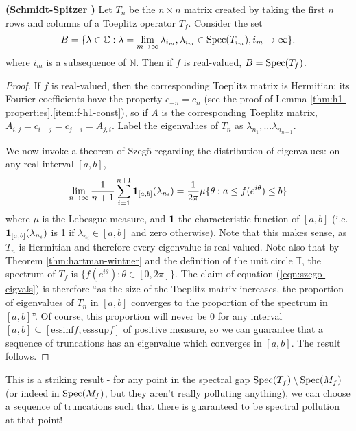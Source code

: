 \documentclass[../main.tex]{subfiles}
\begin{document}
\begin{theorem}{\textbf{(Schmidt-Spitzer \parencite{schmidt1960toeplitz})}}
Let $T_n$ be the $n \times n$ matrix created by taking the first $n$ rows and columns of a Toeplitz operator $T_f$. Consider the set
$$B = \{\lambda \in \mathbb{C} : \lambda = \lim_{m \rightarrow \infty} \lambda_{i_m}, \lambda_{i_m} \in \mathrm{Spec}(T_{i_m}), i_m \rightarrow \infty \}.$$
where $i_m$ is a subsequence of $\mathbb{N}$. Then if $f$ is real-valued, $B = \mathrm{Spec}(T_f)$.
\end{theorem}
\begin{proof}
If $f$ is real-valued, then the corresponding Toeplitz matrix is Hermitian; its Fourier coefficients have the property $\overline{c_{-n}} = c_n$ (see 
the proof of Lemma \ref{thm:h1-properties}.\ref{item:f-h1-const}), so if $A$ is the corresponding Toeplitz matrix,
 $A_{i,j} = c_{i-j} = \overline{c_{j-i}} = \overline{A_{j,i}}$. Label the eigenvalues of $T_n$ as $\lambda_{n_1}, ... \lambda_{n_{n+1}}$. 
 
 We now invoke a theorem of Szeg\"o \cite{grenander2001toeplitz} regarding the distribution of eigenvalues: on any real interval $[a, b]$,
\begin{equation}\label{eqn:szego-eigvals}
\lim_{n \rightarrow \infty} \frac{1}{n+1} \sum_{i=1}^{n+1} \mathbf{1}_{[a, b]}(\lambda_{n_i}) = \frac{1}{2 \pi} \mu\{\theta : a \leq f(e^{i \theta}) \leq b\}
\end{equation}
where $\mu$ is the Lebesgue measure, and $\mathbf{1}$ the characteristic function of $[a,b]$ 
(i.e. $\mathbf{1}_{[a, b]}(\lambda_{n_i})$ is 1 if $\lambda_{n_i} \in [a, b]$ and zero otherwise). Note that this makes sense, as $T_n$ is Hermitian and
therefore every eigenvalue is real-valued. Note also that by Theorem \ref{thm:hartman-wintner} and the definition of the unit circle $\mathbb{T}$,
the spectrum of $T_f$ is $\{f(e^{i \theta}): \theta \in [0, 2\pi]\}$. The claim of equation (\ref{eqn:szego-eigvals}) is therefore 
``as the size of the Toeplitz matrix increases, the proportion of eigenvalues of $T_n$ in $[a, b]$ converges to the proportion of the spectrum in $[a, b]$''. 
Of course, this proportion will never be 0 for any interval $[a, b] \subseteq [\textrm{essinf}f, \textrm{esssup}f]$ of positive measure, so we can guarantee that a sequence of truncations has an eigenvalue which converges in $[a, b]$. The result follows.

\end{proof}

This is a striking result - for any point in the spectral gap $\mathrm{Spec}(T_f) \setminus \mathrm{Spec}(M_f)$ (or indeed in $\mathrm{Spec}(M_f)$, but they aren't really polluting anything), we can choose a sequence of truncations such that
there is guaranteed to be spectral pollution at that point!
\end{document}
